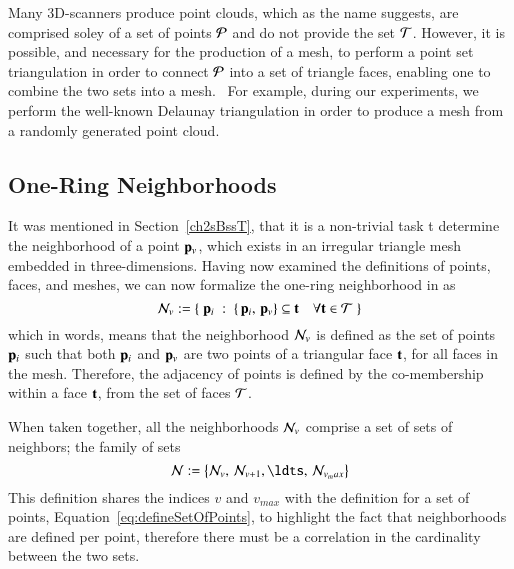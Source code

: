 {{Many 3D-scanners produce point clouds, which as the name suggests, are comprised soley of a set of points $\mathcal{P}$ and do not provide the set $\mathcal{T}$. However, it is possible, and necessary for the production of a mesh, to perform a point set triangulation in order to connect $\mathcal{P}$ into a set of triangle faces, enabling one to combine the two sets into a mesh.~\cite[p.~26]{Mara12} For example, during our experiments, we perform the well-known Delaunay triangulation in order to produce a mesh from a randomly generated point cloud.

%
%
%
%
\subsection{One-Ring Neighborhoods}
\label{ch2s3ssORN}
It was mentioned in Section~\ref{ch2sBssT}, that it is a non-trivial task t determine the neighborhood of a point $\mathbf{p}_v$, which exists in an irregular triangle mesh embedded in three-dimensions. Having now examined the definitions of points, faces, and meshes, we can now formalize the one-ring neighborhood in \tdd{} as
%
\begin{equation}
	\mathcal{N}_v := \left \{\;\mathbf{p}_i\;:\;\left \{\,\mathbf{p}_i,\,\mathbf{p}_v\right \} \subseteq \mathbf{t} \quad \forall \mathbf{t} \in \mathcal{T}\;\right \}
	\label{eq:defineNeighborhood}
\end{equation}%
%
%
%
which in words, means that the neighborhood $\mathcal{N}_v$ is defined as the set of points $\mathbf{p}_i$ such that both $\mathbf{p}_i$ and $\mathbf{p}_v$ are two points of a triangular face $\mathbf{t}$, for all faces in the mesh. Therefore, the adjacency of points is defined by the co-membership within a face $\mathbf{t}$, from the set of faces $\mathcal{T}$.

When taken together, all the neighborhoods $\mathcal{N}_v$ comprise a set of sets of neighbors; the family of sets  
%
\begin{equation}
	\bN := \left \{\bN_v,\,\bN_{v+1},\ldts,\,\bN_{v_max}\right \}
	\label{eq:defineNeighborhood}
\end{equation}%
%
This definition shares the indices $v$ and $v_{max}$ with the definition for a set of points, Equation~\ref{eq:defineSetOfPoints}, to highlight the fact that neighborhoods are defined per point, therefore there must be a correlation in the cardinality between the two sets. 

}}
